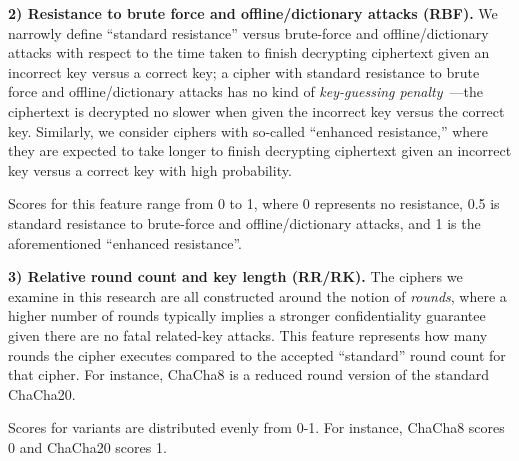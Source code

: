 \textbf{2) Resistance to brute force and offline/dictionary attacks (RBF).} We
narrowly define ``standard resistance'' versus brute-force and
offline/dictionary attacks with respect to the time taken to finish decrypting
ciphertext given an incorrect key versus a correct key; a cipher with standard
resistance to brute force and offline/dictionary attacks has no kind of
\emph{key-guessing penalty}~\cite{Freestyle}---the ciphertext is decrypted no
slower when given the incorrect key versus the correct key. Similarly, we
consider ciphers with so-called ``enhanced resistance,'' where they are expected
to take longer to finish decrypting ciphertext given an incorrect key versus a
correct key with high probability.

Scores for this feature range from 0 to 1, where 0 represents no resistance, 0.5
is standard resistance to brute-force and offline/dictionary attacks, and 1 is
the aforementioned ``enhanced resistance''.

\textbf{3) Relative round count and key length (RR/RK).} The ciphers we examine
in this research are all constructed around the notion of \emph{rounds}, where a
higher number of rounds typically implies a stronger confidentiality guarantee
given there are no fatal related-key attacks. This feature represents how many
rounds the cipher executes compared to the accepted ``standard'' round count for
that cipher. For instance, ChaCha8 is a reduced round version of the standard
ChaCha20.

Scores for variants are distributed evenly from 0-1. For instance, ChaCha8
scores 0 and ChaCha20 scores 1\@.

